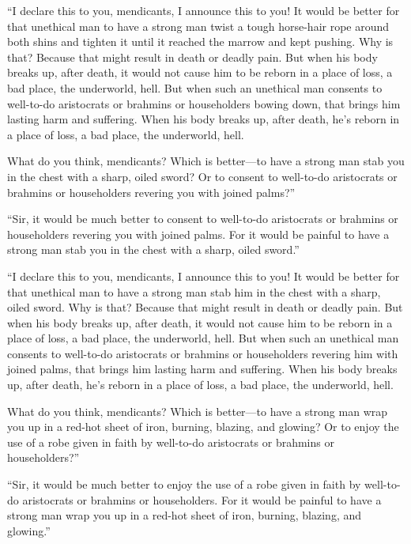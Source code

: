 \documentclass[12pt,openany]{book}%
\begin{document}
“I declare this to you, mendicants, I announce this to you! It would be better for that unethical man to have a strong man twist a tough horse-hair rope around both shins and tighten it until it reached the marrow and kept pushing. Why is that? Because that might result in death or deadly pain. But when his body breaks up, after death, it would not cause him to be reborn in a place of loss, a bad place, the underworld, hell. But when such an unethical man consents to well-to-do aristocrats or brahmins or householders bowing down, that brings him lasting harm and suffering. When his body breaks up, after death, he’s reborn in a place of loss, a bad place, the underworld, hell. 

What do you think, mendicants? Which is better—to have a strong man stab you in the chest with a sharp, oiled sword? Or to consent to well-to-do aristocrats or brahmins or householders revering you with joined palms?” 

“Sir, it would be much better to consent to well-to-do aristocrats or brahmins or householders revering you with joined palms. For it would be painful to have a strong man stab you in the chest with a sharp, oiled sword.” 

“I declare this to you, mendicants, I announce this to you! It would be better for that unethical man to have a strong man stab him in the chest with a sharp, oiled sword. Why is that? Because that might result in death or deadly pain. But when his body breaks up, after death, it would not cause him to be reborn in a place of loss, a bad place, the underworld, hell. But when such an unethical man consents to well-to-do aristocrats or brahmins or householders revering him with joined palms, that brings him lasting harm and suffering. When his body breaks up, after death, he’s reborn in a place of loss, a bad place, the underworld, hell. 

What do you think, mendicants? Which is better—to have a strong man wrap you up in a red-hot sheet of iron, burning, blazing, and glowing? Or to enjoy the use of a robe given in faith by well-to-do aristocrats or brahmins or householders?” 

“Sir, it would be much better to enjoy the use of a robe given in faith by well-to-do aristocrats or brahmins or householders. For it would be painful to have a strong man wrap you up in a red-hot sheet of iron, burning, blazing, and glowing.” 
\end{document}
